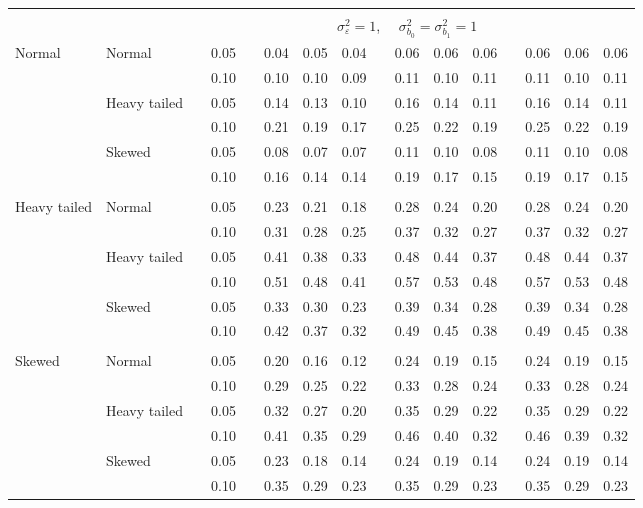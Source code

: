\documentclass{article} %
\begin{document}
\begin{table}[ht]
\begin{scriptsize}
\begin{center}
\begin{tabular}{ll p{.1cm} c p{.1cm} rrr p{.1cm} rrr p{.1cm} rrr}
&&&&&&&&&&&&&&&\\
& && && \multicolumn{9}{c}{$\sigma_{\varepsilon}^2 = 1$, \ \ $\sigma_{b_0}^2 = \sigma_{b_1}^2 = 1$} \\ \cline{6-16}
\rowcolor{gray!20}Normal       & Normal       && 0.05 &&   0.04 & 0.05 & 0.04 && 0.06 & 0.06 & 0.06 && 0.06 & 0.06 & 0.06 \\ 
\rowcolor{gray!20}             &              && 0.10 &&   0.10 & 0.10 & 0.09 && 0.11 & 0.10 & 0.11 && 0.11 & 0.10 & 0.11 \\ 
\rowcolor{gray!20}             & Heavy tailed && 0.05 &&   0.14 & 0.13 & 0.10 && 0.16 & 0.14 & 0.11 && 0.16 & 0.14 & 0.11 \\ 
\rowcolor{gray!20}             &              && 0.10 &&   0.21 & 0.19 & 0.17 && 0.25 & 0.22 & 0.19 && 0.25 & 0.22 & 0.19 \\ 
\rowcolor{gray!20}             & Skewed       && 0.05 &&   0.08 & 0.07 & 0.07 && 0.11 & 0.10 & 0.08 && 0.11 & 0.10 & 0.08 \\ 
\rowcolor{gray!20}             &              && 0.10 &&   0.16 & 0.14 & 0.14 && 0.19 & 0.17 & 0.15 && 0.19 & 0.17 & 0.15 \\ 
             &&&&&&&&&&&&&&&\\
Heavy tailed & Normal       && 0.05 &&   0.23 & 0.21 & 0.18 && 0.28 & 0.24 & 0.20 && 0.28 & 0.24 & 0.20 \\ 
             &              && 0.10 &&   0.31 & 0.28 & 0.25 && 0.37 & 0.32 & 0.27 && 0.37 & 0.32 & 0.27 \\ 
             & Heavy tailed && 0.05 &&   0.41 & 0.38 & 0.33 && 0.48 & 0.44 & 0.37 && 0.48 & 0.44 & 0.37 \\ 
             &              && 0.10 &&   0.51 & 0.48 & 0.41 && 0.57 & 0.53 & 0.48 && 0.57 & 0.53 & 0.48 \\ 
             & Skewed       && 0.05 &&   0.33 & 0.30 & 0.23 && 0.39 & 0.34 & 0.28 && 0.39 & 0.34 & 0.28 \\ 
             &              && 0.10 &&   0.42 & 0.37 & 0.32 && 0.49 & 0.45 & 0.38 && 0.49 & 0.45 & 0.38 \\ 
             &&&&&&&&&&&&&&&\\
Skewed       & Normal       && 0.05 &&   0.20 & 0.16 & 0.12 && 0.24 & 0.19 & 0.15 && 0.24 & 0.19 & 0.15 \\ 
             &              && 0.10 &&   0.29 & 0.25 & 0.22 && 0.33 & 0.28 & 0.24 && 0.33 & 0.28 & 0.24 \\ 
             & Heavy tailed && 0.05 &&   0.32 & 0.27 & 0.20 && 0.35 & 0.29 & 0.22 && 0.35 & 0.29 & 0.22 \\ 
             &              && 0.10 &&   0.41 & 0.35 & 0.29 && 0.46 & 0.40 & 0.32 && 0.46 & 0.39 & 0.32 \\ 
             & Skewed       && 0.05 &&   0.23 & 0.18 & 0.14 && 0.24 & 0.19 & 0.14 && 0.24 & 0.19 & 0.14 \\ 
             &              && 0.10 &&   0.35 & 0.29 & 0.23 && 0.35 & 0.29 & 0.23 && 0.35 & 0.29 & 0.23 \\ 



\end{tabular}
\end{center}
\end{scriptsize}
\end{table}
\end{document}
